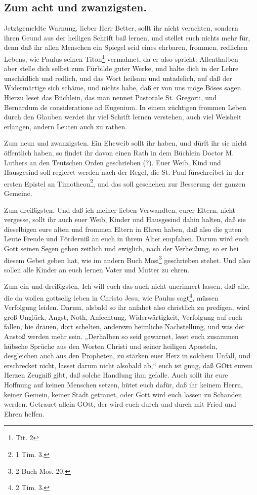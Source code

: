\subsection*{Zum acht und zwanzigsten.}

Jetztgemeldte Warnung, lieber Herr Better, sollt ihr nicht verachten, sondern ihren Grund aus der heiligen Schrift baß lernen, und stellet euch nichts mehr für, denn daß ihr allen Menschen ein Spiegel seid eines ehrbaren, frommen, redlichen Lebens, wie Paulus seinen Titon\footnote{Tit. 2} vermahnet, da er also spricht: Allenthalben aber stelle dich selbst zum Fürbilde guter Werke, und halte dich in der Lehre unschädlich und redlich, und das Wort heilsam und untadelich, auf daß der Widermärtige sich schäme, und nichts habe, daß er von
uns möge Böses sagen. Hierzu leset das Büchlein, das man nennet Pastorale St. Gregorii, und Bernardum de consideratione ad Eugenium. In einem züchtigen frommen Leben durch den Glauben werdet ihr viel Schrift lernen verstehen, auch viel Weisheit erlangen, andern Leuten auch zu rathen.

Zum neun und zwanzigsten. Ein Eheweib sollt ihr haben, und dürft ihr sie nicht öffentlich haben, so findet ihr davon einen Rath in dem Büchlein Doctor M. Luthers an den Teutschen Orden geschrieben (?). Euer Weib, Kind und Hausgesind soll regieret werden nach der Regel, die St. Paul fürschreibet in der ersten Epistel an Timotheon\footnote{1 Tim. 3.}, und das soll geschehen zur Besserung der ganzen Gemeine.

Zum dreißigsten. Und daß ich meiner lieben Verwandten, eurer Eltern, nicht vergesse, sollt ihr auch euer Weib, Kinder und Hausgesind dahin halten, daß sie dieselbigen eure alten und frommen Eltern in Ehren haben, daß also die guten Leute Freude und Förderniß an euch in ihrem Alter empfahen. Darum wird euch Gott seinen Segen geben zeitlich und ewiglich, nach der Verheißung, so er bei diesem Gebet geben hat, wie im andern Buch Mosi\footnote{2 Buch Mos. 20.} geschrieben stehet. Und also sollen alle Kinder an euch lernen Vater und Mutter zu ehren.

Zum ein und dreißigsten. Ich will euch das auch nicht unerinnert lassen, daß alle, die da wollen gottselig leben in Christo Jesu, wie Paulus sagt\footnote{2 Tim. 3.}, müssen Verfolgung leiden. Darum, alsbald so ihr anfahet also christlich zu predigen, wird groß Unglück, Angst, Noth, Anfechtung, Widerwärtigkeit, Verfolgung auf euch fallen, hie dräuen, dort schelten, anderswo heimliche Nachstellung, und was der Anstoß werden mehr sein. „Derhalben so seid gewarnet, leset euch zusammen hübsche Sprüche aus den Worten
Christi und seiner heiligen Aposteln, desgleichen auch aus den Propheten, zu stärken euer Herz in solchem Unfall, und erschrecket nicht, lasset darum nicht alsobald ab,“ euch ist gnug, daß GOtt eurem Herzen Zeugniß gibt, daß solche Handlung ihm gefalle. Auch sollt ihr eure Hoffnung auf keinen Menschen setzen, hütet euch dafür, daß ihr keinem Herrn, keiner Gemein, keiner Stadt getrauet, oder Gott wird euch lassen zu Schanden werden. Getrauet allein GOtt, der wird euch durch und durch mit Fried und Ehren helfen.

